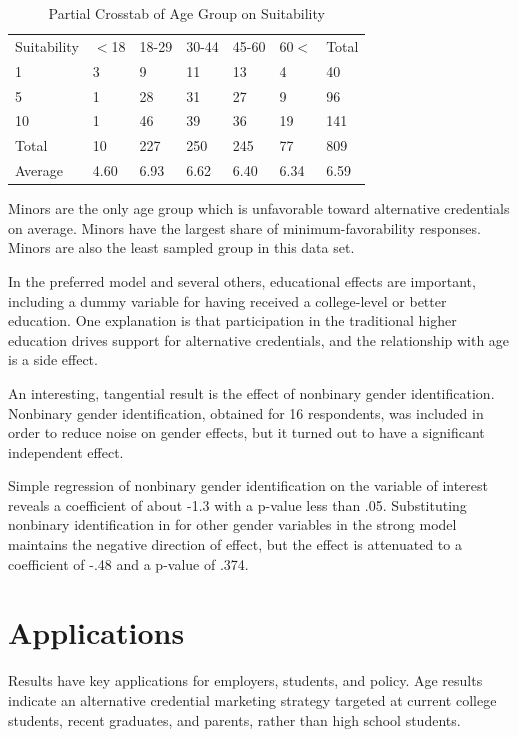 \documentclass[AER]{./aea-latex-templates/AEA}
\begin{document}
\begin{table}
    \caption{Partial Crosstab of Age Group on Suitability}
    \begin{tabular}{lllllll}
        Suitability & $<$18 & 18-29 & 30-44 & 45-60 & 60$<$ & Total \\
        1 & 3 & 9 & 11 & 13 & 4 & 40 \\
        5 & 1 & 28 & 31 & 27 & 9 & 96 \\
        10 & 1 & 46 & 39 & 36 & 19 & 141 \\
        Total & 10 & 227 & 250 & 245 & 77 & 809 \\
        Average & 4.60 & 6.93 & 6.62 & 6.40 & 6.34 & 6.59 %
    \end{tabular}
    \label{tab:partial_crosstab_voi_agegroup}
    \end{table}

Minors are the only age group which is unfavorable toward alternative credentials on average.
Minors have the largest share of minimum-favorability responses.
Minors are also the least sampled group in this data set.

In the preferred model and several others, educational effects are important, including a
dummy variable for having received a college-level or better education.
One explanation is that participation in the traditional higher education
drives support for alternative credentials, and the relationship with age is a
side effect.

An interesting, tangential result is the effect of nonbinary gender identification.
Nonbinary gender identification, obtained for 16 respondents, was included in order to
reduce noise on gender effects, but it turned out to have a significant independent effect.

Simple regression of nonbinary gender identification on the variable of
interest reveals a coefficient of about -1.3 with a p-value less than .05.
Substituting nonbinary identification in for other gender variables in the strong model
maintains the negative direction of effect, but the effect is
attenuated to a coefficient of -.48 and a p-value of .374.

\section{Applications}

Results have key applications for employers, students, and policy.
Age results indicate an alternative credential marketing strategy targeted at
current college students, recent graduates, and parents, rather than high school students.
\end{document}

